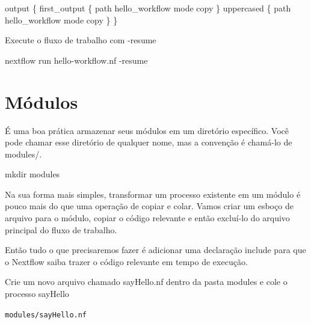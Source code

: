 \documentclass[
  brazilian,
  letterpaper,
  DIV=11,
  numbers=noendperiod]{scrreprt}
\newenvironment{Shaded}{\begin{snugshade}}{\end{snugshade}}
\newcommand{\AttributeTok}[1]{\textcolor[rgb]{0.40,0.45,0.13}{#1}}
\newcommand{\ExtensionTok}[1]{\textcolor[rgb]{0.00,0.23,0.31}{#1}}
\newcommand{\FunctionTok}[1]{\textcolor[rgb]{0.28,0.35,0.67}{#1}}
\newcommand{\NormalTok}[1]{\textcolor[rgb]{0.00,0.23,0.31}{#1}}
\newcommand{\OperatorTok}[1]{\textcolor[rgb]{0.37,0.37,0.37}{#1}}
\newcommand{\StringTok}[1]{\textcolor[rgb]{0.13,0.47,0.30}{#1}}
\begin{document}
\begin{Shaded}
\begin{Highlighting}[]
\NormalTok{output }\OperatorTok{\{}
\NormalTok{    first\_output }\OperatorTok{\{}
\NormalTok{        path }\StringTok{\textquotesingle{}hello\_workflow\textquotesingle{}}
\NormalTok{        mode }\StringTok{\textquotesingle{}copy\textquotesingle{}}
    \OperatorTok{\}}
\NormalTok{    uppercased }\OperatorTok{\{}
\NormalTok{        path }\StringTok{\textquotesingle{}hello\_workflow\textquotesingle{}}
\NormalTok{        mode }\StringTok{\textquotesingle{}copy\textquotesingle{}}
    \OperatorTok{\}}
\OperatorTok{\}}
\end{Highlighting}
\end{Shaded}

Execute o fluxo de trabalho com -resume

\begin{Shaded}
\begin{Highlighting}[]
\ExtensionTok{nextflow}\NormalTok{ run hello{-}workflow.nf }\AttributeTok{{-}resume}
\end{Highlighting}
\end{Shaded}

\section{Módulos}\label{muxf3dulos}

É uma boa prática armazenar seus módulos em um diretório específico.
Você pode chamar esse diretório de qualquer nome, mas a convenção é
chamá-lo de modules/.

\begin{Shaded}
\begin{Highlighting}[]
\FunctionTok{mkdir}\NormalTok{ modules}
\end{Highlighting}
\end{Shaded}

Na sua forma mais simples, transformar um processo existente em um
módulo é pouco mais do que uma operação de copiar e colar. Vamos criar
um esboço de arquivo para o módulo, copiar o código relevante e então
excluí-lo do arquivo principal do fluxo de trabalho.

Então tudo o que precisaremos fazer é adicionar uma declaração include
para que o Nextflow saiba trazer o código relevante em tempo de
execução.

Crie um novo arquivo chamado sayHello.nf dentro da pasta modules e cole
o processo sayHello

\texttt{modules/sayHello.nf}
\end{document}
